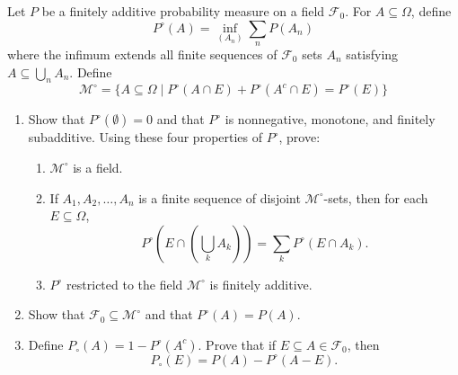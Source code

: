 \documentclass[11pt]{article}
\newcommand\br[1]{\left ( #1 \right )}
\newcommand{\F}{\mathcal{F}}
\newcommand{\M}{\mathcal{M}}
\newcommand{\seq}{\subseteq}
\newcommand{\Om}{\Omega}
\newcommand{\es}{\emptyset}
\newcommand{\mc}{\mathcal}
\newcommand{\ic}{\cap}
\newenvironment{exercise}[2][Exercise]{\begin{trivlist}
\item[\hskip \labelsep {\bfseries #1}\hskip \labelsep {\bfseries #2.}]}{\end{trivlist}}
\begin{document}
\begin{exercise}{3.6}
    Let $P$ be a finitely additive probability measure on a field $\F_0$. For $A \seq \Om$, define
    \[ P^{\circ} (A) = \inf_{(A_n)} \sum_{n} P(A_n) \]
    where the infimum extends all finite sequences of $\F_0$ sets $A_n$ satisfying $A \seq \bigcup_{n} A_n$. Define
    \[ \mathcal{M}^{\circ} = \{ A \seq \Om \mid P^{\circ} (A \ic E) + P^{\circ} (A^c \ic E) = P^{\circ} (E)  \} \]
    \begin{enumerate}
        \item Show that $P^{\circ} (\es) = 0$ and that $P^{\circ}$ is nonnegative, monotone, and finitely subadditive. Using these four properties of $P^{\circ}$, prove:
        \begin{enumerate}
            \item $\mc{M}^\circ$ is a field.
            \item If $A_1, A_2, \ldots, A_n$ is a finite sequence of disjoint $\mathcal{M}^{\circ}$-sets, then for each $E \seq \Om$,
            \[ P^{\circ} \br{E \ic \br{\bigcup_k A_k} } = \sum_{k} P^{\circ} (E \ic A_k). \]
            \item $P^{\circ}$ restricted to the field $\M^{\circ}$ is finitely additive.
        \end{enumerate}
        \item Show that $\F_0 \seq \M^{\circ}$ and that $P^{\circ} (A) = P(A)$.
        \item Define $P_{\circ} (A) = 1 - P^{\circ} (A^c)$. Prove that if $E \seq A \in \F_0$, then
        \[ P_{\circ} (E) = P(A) - P^\circ (A - E). \]
    \end{enumerate}
\end{exercise}
\end{document}
